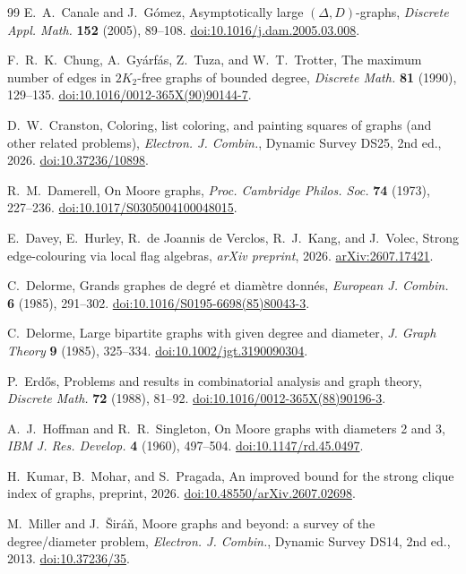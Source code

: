 \documentclass[11pt]{article}
\theoremstyle{plain}
\theoremstyle{definition}
\begin{document}
\begin{thebibliography}{99}
E.~A.~Canale and J.~G\'omez,
Asymptotically large $(\Delta,D)$-graphs,
\emph{Discrete Appl. Math.} \textbf{152} (2005), 89--108.
\href{https://doi.org/10.1016/j.dam.2005.03.008}
{doi:10.1016/j.dam.2005.03.008}.

F.~R.~K.~Chung, A.~Gy\'arf\'as, Z.~Tuza, and W.~T.~Trotter,
The maximum number of edges in $2K_2$-free graphs of bounded degree,
\emph{Discrete Math.} \textbf{81} (1990), 129--135.
\href{https://doi.org/10.1016/0012-365X(90)90144-7}
{doi:10.1016/0012-365X(90)90144-7}.

D.~W.~Cranston,
Coloring, list coloring, and painting squares of graphs
(and other related problems),
\emph{Electron. J. Combin.}, Dynamic Survey DS25, 2nd ed., 2026.
\href{https://doi.org/10.37236/10898}
{doi:10.37236/10898}.

R.~M.~Damerell,
On Moore graphs,
\emph{Proc. Cambridge Philos. Soc.} \textbf{74} (1973), 227--236.
\href{https://doi.org/10.1017/S0305004100048015}
{doi:10.1017/S0305004100048015}.

E.~Davey, E.~Hurley, R.~de Joannis de Verclos, R.~J.~Kang,
and J.~Volec,
Strong edge-colouring via local flag algebras,
\emph{arXiv preprint}, 2026.
\href{https://arxiv.org/abs/2607.17421}
{arXiv:2607.17421}.

C.~Delorme,
Grands graphes de degr\'e et diam\`etre donn\'es,
\emph{European J. Combin.} \textbf{6} (1985), 291--302.
\href{https://doi.org/10.1016/S0195-6698(85)80043-3}
{doi:10.1016/S0195-6698(85)80043-3}.

C.~Delorme,
Large bipartite graphs with given degree and diameter,
\emph{J. Graph Theory} \textbf{9} (1985), 325--334.
\href{https://doi.org/10.1002/jgt.3190090304}
{doi:10.1002/jgt.3190090304}.

P.~Erd\H{o}s,
Problems and results in combinatorial analysis and graph theory,
\emph{Discrete Math.} \textbf{72} (1988), 81--92.
\href{https://doi.org/10.1016/0012-365X(88)90196-3}
{doi:10.1016/0012-365X(88)90196-3}.

A.~J.~Hoffman and R.~R.~Singleton,
On Moore graphs with diameters 2 and 3,
\emph{IBM J. Res. Develop.} \textbf{4} (1960), 497--504.
\href{https://doi.org/10.1147/rd.45.0497}{doi:10.1147/rd.45.0497}.

H.~Kumar, B.~Mohar, and S.~Pragada,
An improved bound for the strong clique index of graphs,
preprint, 2026.
\href{https://doi.org/10.48550/arXiv.2607.02698}
{doi:10.48550/arXiv.2607.02698}.

M.~Miller and J.~\v{S}ir\'a\v{n},
Moore graphs and beyond: a survey of the degree/diameter problem,
\emph{Electron. J. Combin.}, Dynamic Survey DS14, 2nd ed., 2013.
\href{https://doi.org/10.37236/35}{doi:10.37236/35}.

\end{thebibliography}
\end{document}
